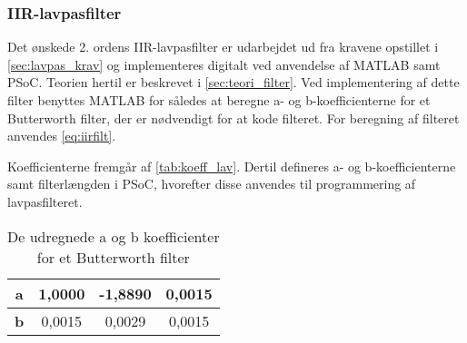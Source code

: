\subsubsection{IIR-lavpasfilter}
Det ønskede 2. ordens IIR-lavpasfilter er udarbejdet ud fra kravene opstillet i \autoref{sec:lavpas_krav}  og implementeres digitalt ved anvendelse af MATLAB samt PSoC. Teorien hertil er beskrevet i \autoref{sec:teori_filter}. 
Ved implementering af dette filter benyttes MATLAB for således at beregne a- og b-koefficienterne for et Butterworth filter, der er nødvendigt for at kode filteret. For beregning af filteret anvendes \autoref{eq:iirfilt}. 

Koefficienterne fremgår af \autoref{tab:koeff_lav}. Dertil defineres a- og b-koefficienterne samt filterlængden i PSoC, hvorefter disse anvendes til programmering af lavpasfilteret. 

\begin{table}[H]
\centering
\begin{tabular}{|c|c|c|c|}
\hline
\textbf{a} & 1,0000 & -1,8890 & 0,0015 \\ \hline
\textbf{b} & 0,0015 & 0,0029  & 0,0015 \\ \hline
\end{tabular}
\caption{De udregnede a og b koefficienter for et Butterworth filter}
\label{tab:koeff_lav}
\end{table}